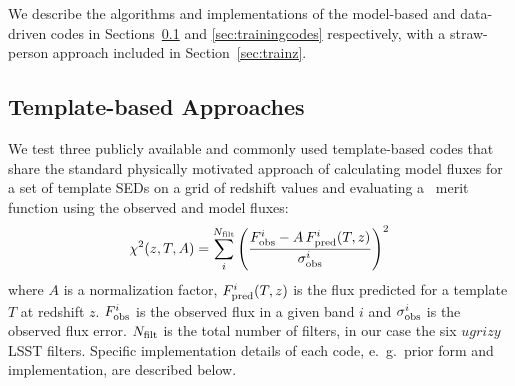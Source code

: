 We describe the algorithms and implementations of the model-based and data-driven codes in Sections~\ref{sec:templatecodes} and \ref{sec:trainingcodes} respectively, with a straw-person approach included in Section~\ref{sec:trainz}.
%
%

\subsection{Template-based Approaches}
\label{sec:templatecodes}

We test three publicly available and commonly used template-based codes that share the standard physically motivated approach of calculating model fluxes for a set of template SEDs on a grid of redshift values and evaluating a \chisq\ merit function using the observed and model fluxes:
\begin{equation} \label{eq_temp_chi}
\chi^2(z,T,A) = \sum_i^{N_{\rm filt}}\left(\frac{F^i_{\rm{obs}} - A \, F^i_{\rm{pred}}(T,z)}{\sigma^i_{\rm{obs}}}\right)^2
\end{equation}
\noindent  where $A$ is a normalization factor, $F^i_{\rm{pred}}(T,z)$ is the flux predicted for a template $T$ at redshift $z$. $F^i_{\rm{obs}}$ is the observed flux in a given band $i$ and $\sigma^i_{\rm{obs}}$ is the observed flux error. $N_{\rm filt}$ is the total number of filters, in our case the six $ugrizy$ LSST filters.  Specific implementation details of each code, e.~g.~prior form and implementation, are described below.

